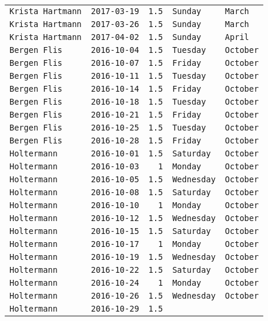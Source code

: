 \documentclass[11pt,A4paper,]{article}
\begin{document}
\begin{longtable}[]{@{}lrrll@{}}
\texttt{Krista\ Hartmann} & \texttt{2017-03-19} & \texttt{1.5} &
\texttt{Sunday} & \texttt{March}\tabularnewline
\texttt{Krista\ Hartmann} & \texttt{2017-03-26} & \texttt{1.5} &
\texttt{Sunday} & \texttt{March}\tabularnewline
\texttt{Krista\ Hartmann} & \texttt{2017-04-02} & \texttt{1.5} &
\texttt{Sunday} & \texttt{April}\tabularnewline
\texttt{Bergen\ Flis} & \texttt{2016-10-04} & \texttt{1.5} &
\texttt{Tuesday} & \texttt{October}\tabularnewline
\texttt{Bergen\ Flis} & \texttt{2016-10-07} & \texttt{1.5} &
\texttt{Friday} & \texttt{October}\tabularnewline
\texttt{Bergen\ Flis} & \texttt{2016-10-11} & \texttt{1.5} &
\texttt{Tuesday} & \texttt{October}\tabularnewline
\texttt{Bergen\ Flis} & \texttt{2016-10-14} & \texttt{1.5} &
\texttt{Friday} & \texttt{October}\tabularnewline
\texttt{Bergen\ Flis} & \texttt{2016-10-18} & \texttt{1.5} &
\texttt{Tuesday} & \texttt{October}\tabularnewline
\texttt{Bergen\ Flis} & \texttt{2016-10-21} & \texttt{1.5} &
\texttt{Friday} & \texttt{October}\tabularnewline
\texttt{Bergen\ Flis} & \texttt{2016-10-25} & \texttt{1.5} &
\texttt{Tuesday} & \texttt{October}\tabularnewline
\texttt{Bergen\ Flis} & \texttt{2016-10-28} & \texttt{1.5} &
\texttt{Friday} & \texttt{October}\tabularnewline
\texttt{Holtermann} & \texttt{2016-10-01} & \texttt{1.5} &
\texttt{Saturday} & \texttt{October}\tabularnewline
\texttt{Holtermann} & \texttt{2016-10-03} & \texttt{1} & \texttt{Monday}
& \texttt{October}\tabularnewline
\texttt{Holtermann} & \texttt{2016-10-05} & \texttt{1.5} &
\texttt{Wednesday} & \texttt{October}\tabularnewline
\texttt{Holtermann} & \texttt{2016-10-08} & \texttt{1.5} &
\texttt{Saturday} & \texttt{October}\tabularnewline
\texttt{Holtermann} & \texttt{2016-10-10} & \texttt{1} & \texttt{Monday}
& \texttt{October}\tabularnewline
\texttt{Holtermann} & \texttt{2016-10-12} & \texttt{1.5} &
\texttt{Wednesday} & \texttt{October}\tabularnewline
\texttt{Holtermann} & \texttt{2016-10-15} & \texttt{1.5} &
\texttt{Saturday} & \texttt{October}\tabularnewline
\texttt{Holtermann} & \texttt{2016-10-17} & \texttt{1} & \texttt{Monday}
& \texttt{October}\tabularnewline
\texttt{Holtermann} & \texttt{2016-10-19} & \texttt{1.5} &
\texttt{Wednesday} & \texttt{October}\tabularnewline
\texttt{Holtermann} & \texttt{2016-10-22} & \texttt{1.5} &
\texttt{Saturday} & \texttt{October}\tabularnewline
\texttt{Holtermann} & \texttt{2016-10-24} & \texttt{1} & \texttt{Monday}
& \texttt{October}\tabularnewline
\texttt{Holtermann} & \texttt{2016-10-26} & \texttt{1.5} &
\texttt{Wednesday} & \texttt{October}\tabularnewline
\texttt{Holtermann} & \texttt{2016-10-29} & \texttt{1.5} &

\end{longtable}
\end{document}
